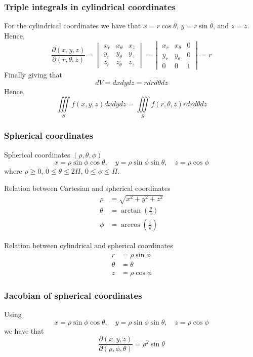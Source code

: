 \documentclass[12pt]{article}
\begin{document}
		\subsubsection{Triple integrals in cylindrical coordinates}
		For the cylindrical coordinates we have that $x=r \cos{\theta}$, $y=r \sin{\theta}$, and $z=z$.
		Hence,
		\[
			\frac{\partial (x,y,z)}{\partial (r,\theta,z)} = 
				\begin{vmatrix}
					x_r & x_\theta & x_z \\
					y_r & y_\theta & y_z \\
					z_r & z_\theta & z_z					
				\end{vmatrix}
				=
				\begin{vmatrix}
					x_r & x_\theta & 0 \\
					y_r & y_\theta & 0 \\
					0 & 0 & 1					
				\end{vmatrix} = r
		\]
		Finally giving that
		\[	
			dV = dxdydz = rdrd\theta dz
		\]
		Hence,
		\[
			\iiint\limits_S f(x,y,z) dxdydz = \iiint\limits_{S'} f(r, \theta, z) r drd\theta dz
		\]
		
		\subsubsection{Spherical coordinates}
		Spherical coordinates $(\rho, \theta, \phi)$
		\[
			x = \rho \sin{\phi} \cos{\theta}, \quad y = \rho \sin{\phi} \sin{\theta}, \quad z = \rho \cos{\phi}
		\]
		where $\rho \ge 0$, $0 \le \theta \le 2 \Pi$, $0 \le \phi \le \Pi$.
		
		Relation between Cartesian and spherical coordinates
		\begin{align*}
			\rho &= \sqrt{x^2 + y^2 + z^2} \\
			\theta &= \arctan{ \left( \frac{y}{z} \right)} \\
			\phi &= \arccos{ \left(\frac{z}{\rho} \right)}
		\end{align*}
		
		Relation between cylindrical and spherical coordinates
		\begin{align*}
			r &= \rho \sin{\phi} \\ 
			\theta &= \theta \\
			z &= \rho \cos{\phi}
		\end{align*}
		
		\subsubsection{Jacobian of spherical coordinates}
		Using
		\[
			x = \rho \sin{\phi} \cos{\theta}, \quad y = \rho \sin{\phi} \sin{\theta}, \quad z = \rho \cos{\phi}
		\]
		we have that
		\[
			\frac{\partial (x,y,z)}{\partial (\rho,\phi,\theta)} = \rho^2 \sin{\theta}
		\]
		
\end{document}
